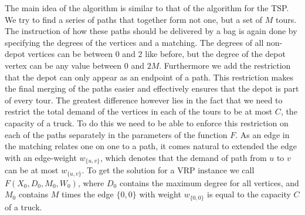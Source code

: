 \documentclass[12pt]{article}
\begin{document}
    The main idea of the algorithm is similar to that of the algorithm for the TSP\@. We try to find
    a series of paths that together form not one, but a set of $M$ tours. The instruction of how
    these paths should be delivered by a bag is again done by specifying the degrees of the vertices
    and a matching. The degrees of all non-depot vertices can be between 0 and 2 like before, but
    the degree of the depot vertex can be any value between 0 and $2M$. Furthermore we add the
    restriction that the depot can only appear as an endpoint of a path. This restriction makes the
    final merging of the paths easier and effectively ensures that the depot is part of every tour.
    The greatest difference however lies in the fact that we need to restrict the total demand of
    the vertices in each of the tours to be at most $C$, the capacity of a truck.
    To do this we need to be able to enforce this restriction on each of the paths separately in the
    parameters of the function $F$.
    As an edge in the matching relates one on one to a path, it comes natural to extended the edge
    with an edge-weight $w_{\{u, v\}}$, which denotes that the demand of path from $u$ to $v$ can be
    at most $w_{\{u, v\}}$.
    To get the solution for a VRP instance we call $F(X_0, D_0, M_0, W_0)$, where $D_0$ contains the
    maximum degree for all vertices, and $M_0$ contains $M$ times the edge $\{0, 0\}$ with weight
    $w_{\{0, 0\}}$ is equal to the capacity $C$ of a truck.
\end{document}
